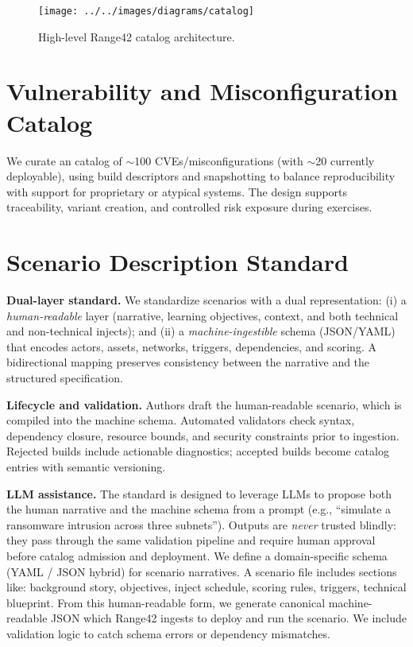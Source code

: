 \documentclass[11pt]{article}
\begin{document}
\begin{figure}[h]
\centering
\texttt{[image: ../../images/diagrams/catalog]}
\caption{High-level Range42 catalog architecture.}
\label{fig:arch_catalog}
\end{figure}

\section{Vulnerability and Misconfiguration Catalog}
We curate an catalog of $\sim$100 CVEs/misconfigurations (with $\sim$20 currently deployable), using build descriptors and snapshotting to balance reproducibility with support for proprietary or atypical systems. The design supports traceability, variant creation, and controlled risk exposure during exercises.

\section{Scenario Description Standard}

\textbf{Dual-layer standard.} We standardize scenarios with a dual representation:
(i) a \emph{human-readable} layer (narrative, learning objectives, context, and both technical and non-technical injects); and
(ii) a \emph{machine-ingestible} schema (JSON/YAML) that encodes actors, assets, networks, triggers, dependencies, and scoring.
A bidirectional mapping preserves consistency between the narrative and the structured specification.

\textbf{Lifecycle and validation.} Authors draft the human-readable scenario, which is compiled into the machine schema.
Automated validators check syntax, dependency closure, resource bounds, and security constraints prior to ingestion.
Rejected builds include actionable diagnostics; accepted builds become catalog entries with semantic versioning.

\textbf{LLM assistance.} The standard is designed to leverage LLMs to propose both the human narrative and the machine schema from a prompt (e.g., ``simulate a ransomware intrusion across three subnets'').
Outputs are \emph{never} trusted blindly: they pass through the same validation pipeline and require human approval before catalog admission and deployment.
We define a domain-specific schema (YAML / JSON hybrid) for scenario narratives. A scenario file includes sections like: background story, objectives, inject schedule, scoring rules, triggers, technical blueprint. From this human-readable form, we generate canonical machine-readable JSON which Range42 ingests to deploy and run the scenario. We include validation logic to catch schema errors or dependency mismatches.
\end{document}
